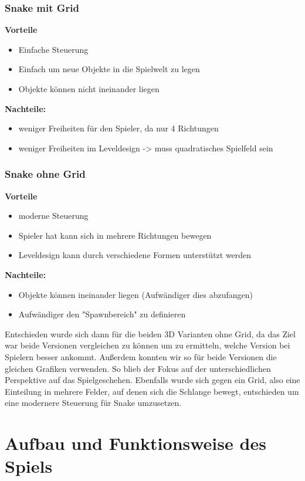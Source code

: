 \subsubsection{Snake mit Grid}
\textbf{Vorteile}
\begin{itemize}
\item Einfache Steuerung
\item Einfach um neue Objekte in die Spielwelt zu legen
\item Objekte können nicht ineinander liegen
\end{itemize}
\textbf{Nachteile:}
\begin{itemize}
\item weniger Freiheiten für den Spieler, da nur 4 Richtungen
\item weniger Freiheiten im Leveldesign -> muss quadratisches Spielfeld sein
\end{itemize}
\subsubsection{Snake ohne Grid}
\textbf{Vorteile}
\begin{itemize}
\item moderne Steuerung
\item Spieler hat kann sich in mehrere Richtungen bewegen
\item Leveldesign kann durch verschiedene Formen unterstützt werden
\end{itemize}
\textbf{Nachteile:}
\begin{itemize}
\item Objekte können ineinander liegen (Aufwändiger dies abzufangen)
\item Aufwändiger den "Spawnbereich" zu definieren
\end{itemize}

Entschieden wurde sich dann für die beiden 3D Varianten ohne Grid, da das Ziel war beide Versionen vergleichen zu können um zu ermitteln, welche Version bei Spielern besser ankommt. Außerdem konnten wir so für beide Versionen die gleichen Grafiken verwenden. So blieb der Fokus auf der unterschiedlichen Perspektive auf das Spielgeschehen. Ebenfalls wurde sich gegen ein Grid, also eine Einteilung in mehrere Felder, auf denen sich die Schlange bewegt, entschieden um eine modernere Steuerung für Snake umzusetzen.
\section{Aufbau und Funktionsweise des Spiels}
